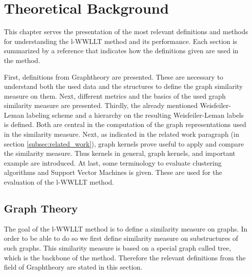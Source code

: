 \section{Theoretical Background} \label{sec:theoretical_background}

This chapter serves the presentation of the most relevant definitions and methods for understanding the l-WWLLT method and its performance.
Each section is summarized by a reference that indicates how the definitions given are used in the method.

First, definitions from Graphtheory are presented. 
These are necessary to understand both the used data and the structures to define the graph similarity measure on them.
Next, different metrics and the basics of the used graph similarity measure are presented.
Thirdly, the already mentioned Weisfeiler-Leman labeling scheme and a hierarchy on the resulting Weisfeiler-Leman labels is defined. 
Both are central in the computation of the graph representations used in the similarity measure.
Next, as indicated in the related work paragraph (in section \ref{subsec:related_work}), graph kernels prove useful to apply and compare the similarity measure.
Thus kernels in general, graph kernels, and important example are introduced.
At last, some terminology to evaluate clustering algorithms and Support Vector Machines is given. 
These are used for the evaluation of the l-WWLLT method.

\subsection{Graph Theory} \label{subsec:def_graphtheory}
	
	The goal of the l-WWLLT method is to define a similarity measure on graphs.
	In order to be able to do so we first define similarity measure on substructures of such graphs.
	This similarity measure is based on a special graph called tree, which is the backbone of the method.	
	Therefore the relevant definitions from the field of Graphtheory are stated in this section.
	
